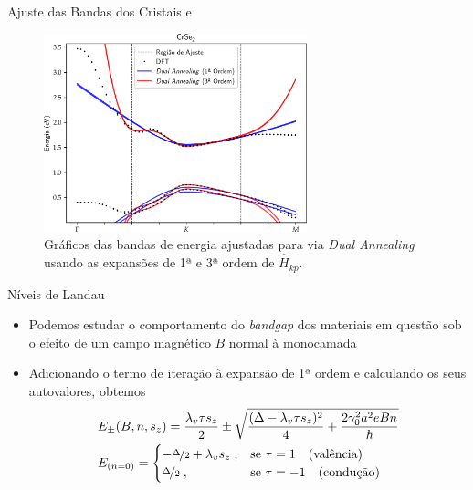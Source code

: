 \begin{frame}{Ajuste das Bandas dos Cristais  e }
  \begin{figure}
    \centering
    \includegraphics[width=0.68\textwidth]{imagens/crse2_dual_annealing_order_13.png}
    \caption{
      Gráficos das bandas de energia ajustadas para  via \textit{Dual Annealing}
      usando as expansões de 1ª e 3ª ordem de $ \hat{H}_{kp} $.
    }
  \end{figure}
\end{frame}

\begin{frame}{Níveis de Landau}
  \begin{itemize}
    \item Podemos estudar o comportamento do \textit{bandgap} dos materiais em
          questão sob o efeito de um campo magnético $B$ normal à monocamada
    \item Adicionando o termo de iteração à expansão de 1ª ordem e calculando os
          seus autovalores, obtemos
          \begin{align*}
             & E_\pm (B, n, s_z) = \frac{\lambda_v \tau s_z}{2} \pm
            \sqrt{
              \frac{(\Delta - \lambda_v \tau s_z)^2}{4} +
              \frac{2 \gamma_0^2 a^2 e B n}{\hbar}
            }
            \\
             & E_{(n = 0)} =
            \begin{cases}
              - \nicefrac{\Delta}{2} + \lambda_v s_z \;, & \text{se } \tau = 1 \quad \text{(valência)}  \\
              \nicefrac{\Delta}{2}                   \;, & \text{se } \tau = -1 \quad \text{(condução)} \\
            \end{cases}
            \\
          \end{align*}
  \end{itemize}
\end{frame}

